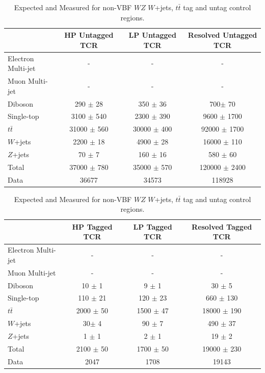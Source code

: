 \begin{table}
\begin{tabular}{|l|c|c|c|}
\hline
	  &	 HP Untagged TCR &	 LP Untagged TCR &	Resolved Untagged TCR \\\hline 
	Electron Multi-jet &	- &	- &	- \\\hline 
	Muon Multi-jet &	- &	- &	- \\\hline 
	Diboson &	290 $\pm$ 28 &	350 $\pm$ 36 &	700$\pm$ 70 \\\hline 
	Single-top &	3100 $\pm$ 540 &	2300 $\pm$ 390 &	9600 $\pm$ 1700\\\hline 
	$t\bar{t}$ &	31000 $\pm$ 560 &	30000 $\pm$ 400 &	92000 $\pm$ 1700 \\\hline 
	$W$+jets &	2200 $\pm$ 18 &	4900 $\pm$ 28 &	16000 $\pm$ 110 \\\hline 
	$Z$+jets &	70 $\pm$ 7 &	160 $\pm$ 16 &	580 $\pm$ 60 \\\hline 
	Total &	37000 $\pm$ 780&	35000 $\pm$ 570&	120000 $\pm$ 2400 \\\hline 
	Data &	36677 &	34573 &	118928 \\\hline 
\end{tabular}

\begin{tabular}{|l|c|c|c|}
\hline
	  &	 HP Tagged TCR &	 LP Tagged TCR &	Resolved Tagged TCR \\\hline 
	Electron Multi-jet &	- &	- &	- \\\hline 
	Muon Multi-jet &	- &	- &	- \\\hline 
	Diboson &	10 $\pm$ 1 &	9 $\pm$ 1 &	30 $\pm$ 5\\\hline 
	Single-top &	110 $\pm$ 21 &	120 $\pm$ 23 &	660 $\pm$ 130 \\\hline 
	$t\bar{t}$ &	2000 $\pm$ 50 &	1500 $\pm$ 47 &	18000 $\pm$ 190 \\\hline 
	$W$+jets &	30$\pm$ 4 &	90 $\pm$ 7 &	490 $\pm$ 37 \\\hline 
	$Z$+jets &	1 $\pm$ 1 &	2 $\pm$ 1 &	19 $\pm$ 2 \\\hline 
	Total &	2100 $\pm$ 50 &	1700 $\pm$ 50 &	19000 $\pm$ 230 \\\hline 
	Data &	2047 &	1708 &	19143 \\\hline 
\end{tabular}


\caption{Expected and Measured for non-VBF $WZ$ $W$+jets, $t\bar{t}$ tag and untag control regions.}
\label{tbl:hvtwz_yields_cr}
\end{table}

